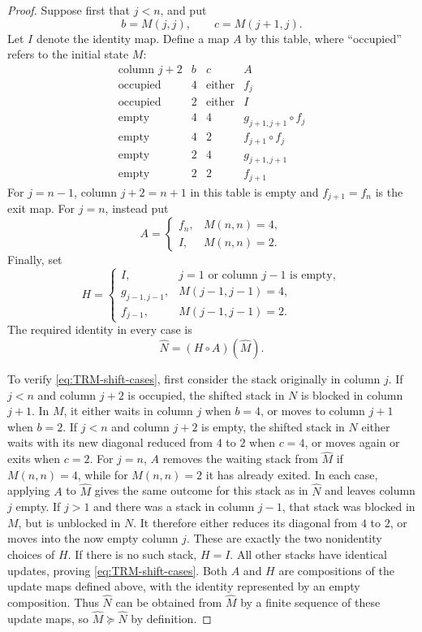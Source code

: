 \documentclass[reqno]{amsart}
\begin{document}
\begin{proof}
Suppose first that $j<n$, and put
\[
    b=M(j,j),\qquad c=M(j+1,j).
\]
Let $I$ denote the identity map. Define a map $A$ by this table,
where ``occupied'' refers to the initial state $M$:
\[
\begin{array}{c|c|c|c}
\text{column }j+2&b&c&A\\ \hline
\text{occupied}&4&\text{either}&f_j\\
\text{occupied}&2&\text{either}&I\\
\text{empty}&4&4&g_{j+1,j+1}\circ f_j\\
\text{empty}&4&2&f_{j+1}\circ f_j\\
\text{empty}&2&4&g_{j+1,j+1}\\
\text{empty}&2&2&f_{j+1}
\end{array}
\]
For $j=n-1$, column $j+2=n+1$ in this table is empty and $f_{j+1}=f_n$
is the exit map. For $j=n$, instead put
\[
 A=\begin{cases}f_n,&M(n,n)=4,\\ I,&M(n,n)=2.\end{cases}
\]
Finally, set
\[
 H=\begin{cases}
 I,&j=1\text{ or column }j-1\text{ is empty},\\
 g_{j-1,j-1},&M(j-1,j-1)=4,\\
 f_{j-1},&M(j-1,j-1)=2.
 \end{cases}
\]
The required identity in every case is
\begin{equation}\label{eq:TRM-shift-cases}
    \widehat N=(H\circ A)(\widehat M).
\end{equation}

To verify \eqref{eq:TRM-shift-cases}, first consider the stack originally
in column $j$. If $j<n$ and column $j+2$ is occupied, the shifted stack
in $N$ is blocked in column $j+1$. In $M$, it either waits in column
$j$ when $b=4$, or moves to column $j+1$ when $b=2$. If $j<n$ and
column $j+2$ is empty, the shifted stack in $N$ either waits with its
new diagonal reduced from $4$ to $2$ when $c=4$, or moves again or exits
when $c=2$. For $j=n$, $A$ removes the waiting stack from $\widehat M$
if $M(n,n)=4$, while for $M(n,n)=2$ it has already exited. In each case,
applying $A$ to $\widehat M$ gives the same outcome for this stack as in
$\widehat N$ and leaves column $j$ empty. If $j>1$ and there was a stack in column $j-1$,
that stack was blocked in $M$, but is unblocked in $N$.
It therefore either reduces its diagonal from $4$ to $2$, or moves
into the now empty column $j$. These are exactly the two nonidentity
choices of $H$. If there is no such stack, $H=I$. All other stacks
have identical updates, proving \eqref{eq:TRM-shift-cases}. Both $A$
and $H$ are compositions of the update maps defined above,
with the identity represented by an empty composition. Thus
$\widehat N$ can be obtained from $\widehat M$ by a finite sequence of
these update maps, so $\widehat M\succeq\widehat N$ by definition.
\end{proof}
\end{document}
